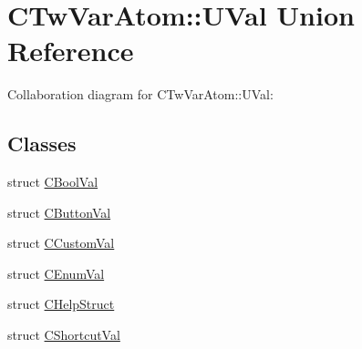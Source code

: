 \hypertarget{union_c_tw_var_atom_1_1_u_val}{\section{C\+Tw\+Var\+Atom\+:\+:U\+Val Union Reference}
\label{union_c_tw_var_atom_1_1_u_val}
}


Collaboration diagram for C\+Tw\+Var\+Atom\+:\+:U\+Val\+:
\subsection*{Classes}
\begin{DoxyCompactItemize}
\item 
struct \hyperlink{struct_c_tw_var_atom_1_1_u_val_1_1_c_bool_val}{C\+Bool\+Val}
\item 
struct \hyperlink{struct_c_tw_var_atom_1_1_u_val_1_1_c_button_val}{C\+Button\+Val}
\item 
struct \hyperlink{struct_c_tw_var_atom_1_1_u_val_1_1_c_custom_val}{C\+Custom\+Val}
\item 
struct \hyperlink{struct_c_tw_var_atom_1_1_u_val_1_1_c_enum_val}{C\+Enum\+Val}
\item 
struct \hyperlink{struct_c_tw_var_atom_1_1_u_val_1_1_c_help_struct}{C\+Help\+Struct}
\item 
struct \hyperlink{struct_c_tw_var_atom_1_1_u_val_1_1_c_shortcut_val}{C\+Shortcut\+Val}
\end{DoxyCompactItemize}
